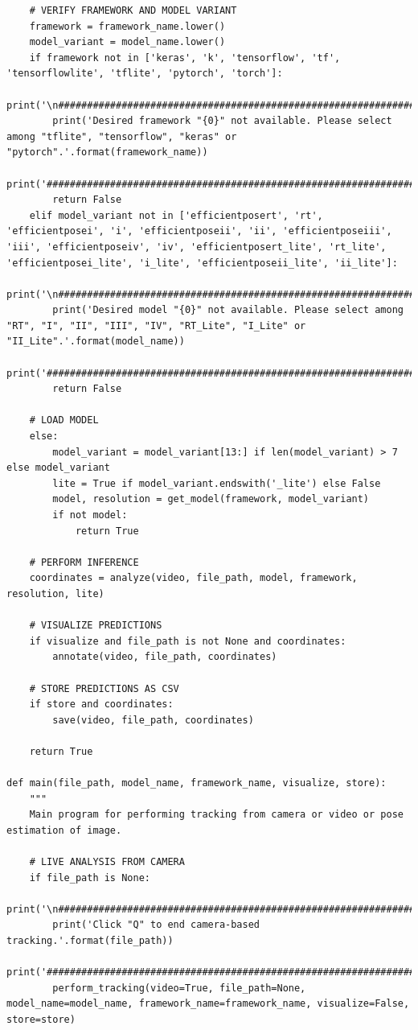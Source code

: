 \documentclass{fisatprojectfinal}
\begin{document}
\begin{appendices}
\begin{lstlisting}
    # VERIFY FRAMEWORK AND MODEL VARIANT
    framework = framework_name.lower()
    model_variant = model_name.lower()
    if framework not in ['keras', 'k', 'tensorflow', 'tf', 'tensorflowlite', 'tflite', 'pytorch', 'torch']:
        print('\n##########################################################################################################')
        print('Desired framework "{0}" not available. Please select among "tflite", "tensorflow", "keras" or "pytorch".'.format(framework_name))
        print('##########################################################################################################\n')
        return False
    elif model_variant not in ['efficientposert', 'rt', 'efficientposei', 'i', 'efficientposeii', 'ii', 'efficientposeiii', 'iii', 'efficientposeiv', 'iv', 'efficientposert_lite', 'rt_lite', 'efficientposei_lite', 'i_lite', 'efficientposeii_lite', 'ii_lite']:
        print('\n##########################################################################################################')
        print('Desired model "{0}" not available. Please select among "RT", "I", "II", "III", "IV", "RT_Lite", "I_Lite" or "II_Lite".'.format(model_name))
        print('##########################################################################################################\n')
        return False
        
    # LOAD MODEL
    else:
        model_variant = model_variant[13:] if len(model_variant) > 7 else model_variant 
        lite = True if model_variant.endswith('_lite') else False
        model, resolution = get_model(framework, model_variant)
        if not model:
            return True
        
    # PERFORM INFERENCE
    coordinates = analyze(video, file_path, model, framework, resolution, lite)
        
    # VISUALIZE PREDICTIONS
    if visualize and file_path is not None and coordinates:
        annotate(video, file_path, coordinates)
        
    # STORE PREDICTIONS AS CSV
    if store and coordinates:
        save(video, file_path, coordinates)
        
    return True
        
def main(file_path, model_name, framework_name, visualize, store):
    """
    Main program for performing tracking from camera or video or pose estimation of image.
    
    # LIVE ANALYSIS FROM CAMERA
    if file_path is None:
        print('\n##########################################################################################################')
        print('Click "Q" to end camera-based tracking.'.format(file_path))
        print('##########################################################################################################\n')
        perform_tracking(video=True, file_path=None, model_name=model_name, framework_name=framework_name, visualize=False, store=store)


\end{lstlisting}
\end{appendices}
\end{document}

